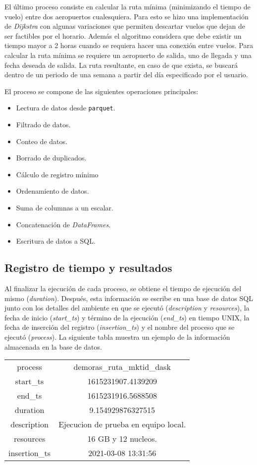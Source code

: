 El último proceso consiste en calcular la ruta mínima (minimizando el tiempo de vuelo) entre dos aeropuertos cualesquiera. Para esto se hizo una implementación de \textit{Dijkstra} con algunas variaciones que permiten descartar vuelos que dejan de ser factibles por el horario. Además el algoritmo considera que debe existir un tiempo mayor a 2 horas cuando se requiera hacer una conexión entre vuelos. Para calcular la ruta mínima se requiere un aeropuerto de salida, uno de llegada y una fecha deseada de salida. La ruta resultante, en caso de que exista, se buscará dentro de un periodo de una semana a partir del día especificado por el usuario.   

El proceso se compone de las siguientes operaciones principales:

\begin{itemize}
	\item Lectura de datos desde \texttt{parquet}.
	\item Filtrado de datos.
	\item Conteo de datos.
	\item Borrado de duplicados.
	\item Cálculo de registro mínimo
	\item Ordenamiento de datos.
	\item Suma de columnas a un escalar.
	\item Concatenación de \textit{DataFrames}.
	\item Escritura de datos a SQL.
\end{itemize}

\subsection{Registro de tiempo y resultados}

Al finalizar la ejecución de cada proceso, se obtiene el tiempo de ejecución del mismo (\textit{duration}). Después, esta información se escribe en una base de datos SQL junto con los detalles del ambiente en que se ejecutó (\textit{description} y \textit{resources}), la fecha de inicio (\textit{start\_ts}) y término de la ejecución (\textit{end\_ts}) en tiempo UNIX, la fecha de inserción del registro (\textit{insertion\_ts}) y el nombre del proceso que se ejecutó (\textit{process}). La siguiente tabla muestra un ejemplo de la información almacenada en la base de datos.

\begin{center}
\begin{tabular}{|c|c|}
 \hline
  process & demoras\_ruta\_mktid\_dask \\ 
  start\_ts & 1615231907.4139209 \\
  end\_ts & 1615231916.5688508 \\ 
  duration & 9.154929876327515 \\ 
  description & Ejecucion de prueba en equipo local. \\
  resources & 16 GB y 12 nucleos. \\
  insertion\_ts & 2021-03-08 13:31:56 \\
  \hline
\end{tabular}
\end{center}


